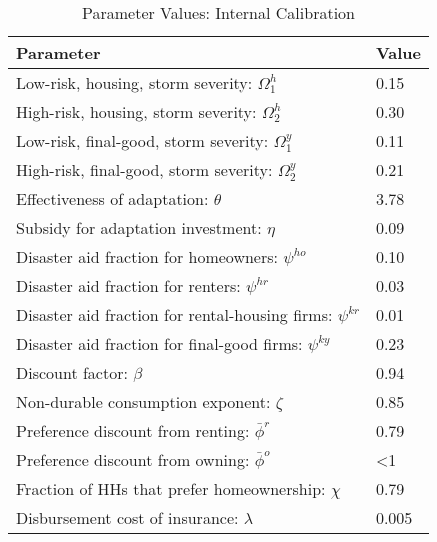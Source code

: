 \begin{table}[H] 
\singlespace 
\center 
\caption{Parameter Values: Internal Calibration} \label{tab:params_mom}
\vspace{-.1in} 
\begin{tabular}{l l}\hline 
\hline 
 Parameter & Value  \\ 
 \hline 
 Low-risk, housing, storm severity: $\Omega_1^h$ &      0.15 \\  High-risk, housing, storm severity: $\Omega_2^h$ &      0.30 \\  Low-risk, final-good, storm severity: $\Omega_1^y$ &      0.11 \\  High-risk, final-good, storm severity: $\Omega_2^y$ &      0.21 \\  Effectiveness of adaptation: $\theta$ &      3.78   \\  Subsidy for adaptation investment: $\eta$ &      0.09  \\  Disaster aid fraction for homeowners: $\psi^{ho}$ &      0.10   \\  Disaster aid fraction for renters: $\psi^{hr}$ &      0.03  \\  Disaster aid fraction for rental-housing firms: $\psi^{kr}$ &      0.01  \\  Disaster aid fraction  for final-good firms: $\psi^{ky}$ &      0.23  \\  Discount factor: $\beta$ &      0.94  \\  Non-durable consumption exponent: $\zeta$ &      0.85  \\  Preference discount from renting: $\bar{\phi}^r$ &      0.79   \\  Preference discount from owning: $\bar{\phi}^o$ &  <1  \\  Fraction of HHs that prefer homeownership: $\chi$ &      0.79  \\  Disbursement cost of insurance: $\lambda$ &     0.005  \\ \hline 
\end{tabular}
\end{table} 
